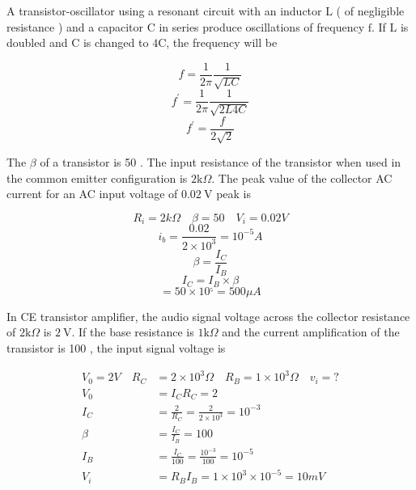 \begin{enumerate}
		\begin{minipage}{\textwidth}
		\item A transistor-oscillator using a resonant circuit with an inductor $\mathrm{L}$ ( of negligible resistance ) and a capacitor $\mathrm{C}$ in series produce oscillations of frequency $\mathrm{f}$. If $\mathrm{L}$ is doubled and $\mathrm{C}$ is changed to $4 \mathrm{C}$, the frequency will be
	\end{minipage}
	\begin{answer}
		$$f=\frac{1}{2\pi}\frac{1}{\sqrt{LC}}$$
		$$f^{\prime}=\frac{1}{2\pi}\frac{1}{\sqrt{2L4C}}$$
		$$f^{\prime}=\frac{f}{2\sqrt{2}}$$
	\end{answer}
	\begin{minipage}{\textwidth}
	\item The $\beta$ of a transistor is 50 . The input resistance of the transistor when used in the common emitter configuration is $2 \mathrm{k} \Omega$. The peak value of the collector AC current for an AC input voltage of $0.02 \mathrm{~V}$ peak is
\end{minipage}
\begin{answer}
	$$R_i=2k\Omega \quad \beta=50 \quad V_i=0.02V$$
	$$i_{b}=\frac{0.02}{2\times 10^3}=10^{-5}A$$
	$$\beta=\frac{I_C}{I_B}$$
	$$I_C=I_B\times \beta $$
	$$=50\times 10^{_5}=500\mu A$$
\end{answer}
	\begin{minipage}{\textwidth}
	\item In CE transistor amplifier, the audio signal voltage across the collector resistance of $2 \mathrm{k} \Omega$ is $2 \mathrm{~V}$. If the base resistance is $1 \mathrm{k} \Omega$ and the current amplification of the transistor is 100 , the input signal voltage is
\end{minipage}
\begin{answer}
	\begin{align*}
	V_0=2V \quad R_C&=2\times 10^3\Omega \quad R_B=1\times 10^3\Omega \quad v_i=?\\
	V_0&=I_CR_C=2\\
	I_C&=\frac{2}{R_C}=\frac{2}{2\times 10^3}=10^{-3}\\
	\beta&=\frac{I_C}{I_B}=100\\
	I_B&=\frac{I_C}{100}=\frac{10^{-3}}{100}=10^{-5}\\
	V_i&=R_BI_B=1\times 10^3 \times 10^{-5}=10mV
	\end{align*}
\end{answer}

\end{enumerate}
